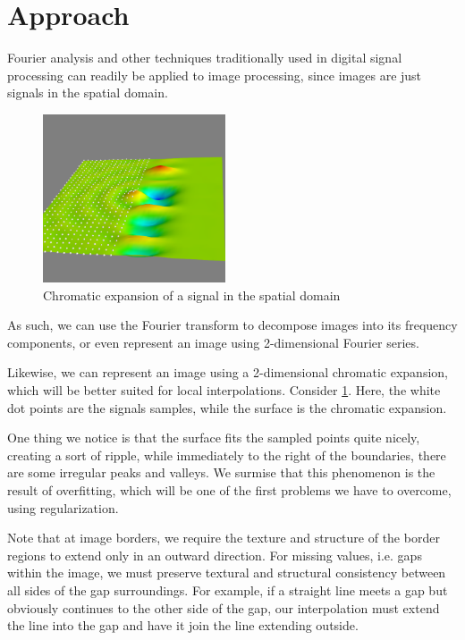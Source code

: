 \documentclass[11pt,oneside]{book}
\theoremstyle{plain}
\theoremstyle{definition}
\theoremstyle{remark}
\begin{document}
\section{Approach} \label{approach} %

Fourier analysis and other techniques traditionally used in digital signal processing
can readily be applied to image processing, since images are just signals in the spatial
domain. 

\begin{figure}
  \vspace{-10pt}
  \includegraphics[width=0.48\textwidth]{31x16bump.png}
  \caption{Chromatic expansion of a signal in the spatial domain}
  \vspace{-20pt}
  \label{fig:cd_image_ex}
  \vspace{-10pt}
\end{figure}

As such, we can use the Fourier transform to decompose images into its frequency
components, or even represent an image using 2-dimensional Fourier series.

Likewise, we can represent an image using a 2-dimensional chromatic expansion,
which will be better suited for local interpolations. 
Consider \cref{fig:cd_image_ex}. Here, the white dot points are the signals
samples, while the surface is the chromatic expansion.

One thing we notice is that the surface fits the sampled points quite nicely,
creating a sort of ripple, while immediately to the right of the boundaries, 
there are some irregular peaks and valleys. We surmise that this phenomenon 
is the result of overfitting, which will be one of the first problems we have to overcome, using regularization. 

Note that at image borders, we require the texture and structure of the
border regions to extend only in an outward direction. For missing values, i.e. 
gaps within the image, we must preserve textural and structural consistency 
between all sides of the gap surroundings. For example, if a straight line 
meets a gap but obviously continues to the other side of the gap, our interpolation
must extend the line into the gap and have it join the line extending outside.
\end{document}
